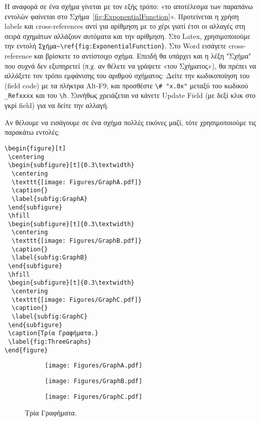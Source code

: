 Η αναφορά σε ένα σχήμα γίνεται με τον εξής τρόπο: 
«το αποτέλεσμα των παραπάνω εντολών φαίνεται στο 
Σχήμα~\ref{fig:ExponentialFunction}».
Προτείνεται η χρήση labels και cross-references αντί για αρίθμηση με το χέρι γιατί έτσι οι αλλαγές στη σειρά σχημάτων αλλάζουν αυτόματα και την αρίθμηση.
Στο Latex, χρησιμοποιούμε την εντολή 
\verb|Σχήμα~\ref{fig:ExponentialFunction}|.
Στο Word εισάγετε cross-reference και βρίσκετε το αντίστοιχο σχήμα.
Επειδή θα υπάρχει και η λέξη "Σχήμα" που συχνά δεν εξυπηρετεί (π.χ. αν θέλετε να γράψετε «του Σχήματος»), θα πρέπει να αλλάξετε τον τρόπο εμφάνισης του αριθμού σχήματος: Δείτε την κωδικοποίηση του (field code) με τα πλήκτρα Alt-F9, και προσθέστε \verb|\# "x.0x"| μεταξύ του κωδικού \verb|_Refxxxx| και του \verb|\h|.
Συνήθως χρειάζεται να κάνετε Update Field (με δεξί κλικ στο γκρί field) για να δείτε την αλλαγή.

Αν θέλουμε να εισάγουμε σε ένα σχήμα πολλές εικόνες μαζί, τότε χρησιμοποιούμε 
τις παρακάτω εντολές:

\begin{verbatim}
\begin{figure}[t]
 \centering
 \begin{subfigure}[t]{0.3\textwidth}
  \centering
  \texttt{[image: Figures/GraphA.pdf]}
  \caption{}
  \label{subfig:GraphA}
 \end{subfigure}
 \hfill
 \begin{subfigure}[t]{0.3\textwidth}
  \centering
  \texttt{[image: Figures/GraphB.pdf]}
  \caption{}
  \label{subfig:GraphB}
 \end{subfigure}
 \hfill
 \begin{subfigure}[t]{0.3\textwidth}
  \centering
  \texttt{[image: Figures/GraphC.pdf]}
  \caption{}
  \label{subfig:GraphC}
 \end{subfigure}
 \caption{Τρία Γραφήματα.}
 \label{fig:ThreeGraphs}
\end{figure}
\end{verbatim}

\begin{figure}[t]
	\centering
	\begin{subfigure}[t]{0.3\textwidth}
		\centering
		\texttt{[image: Figures/GraphA.pdf]}
		\caption{}
		\label{subfig:GraphA}
	\end{subfigure}
	\hfill
	\begin{subfigure}[t]{0.3\textwidth}
		\centering
		\texttt{[image: Figures/GraphB.pdf]}
		\caption{}
		\label{subfig:GraphB}
	\end{subfigure}
	\hfill
	\begin{subfigure}[t]{0.3\textwidth}
		\centering
		\texttt{[image: Figures/GraphC.pdf]}
		\caption{}
		\label{subfig:GraphC}
	\end{subfigure}
	\caption{Τρία Γραφήματα.}
	\label{fig:ThreeGraphs}
\end{figure}

